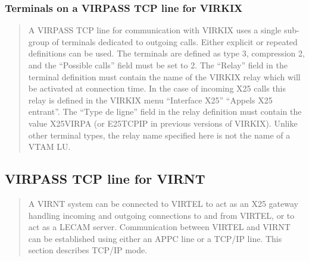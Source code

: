 \documentclass[letterpaper,10pt,english]{sphinxmanual}
\begin{document}
\subsubsection{Terminals on a VIRPASS TCP line for VIRKIX}
\label{\detokenize{connectivity_guide:terminals-on-a-virpass-tcp-line-for-virkix}}\begin{quote}

A VIRPASS TCP line for communication with VIRKIX uses a single sub-group of terminals dedicated to outgoing calls. Either explicit or repeated definitions can be used. The terminals are defined as type 3, compression 2, and the “Possible calls” field must be set to 2. The “Relay” field in the terminal definition must contain the name of the VIRKIX relay which will be activated at connection time. In the case of incoming X25 calls this relay is defined in the VIRKIX menu “Interface X25” \textendash{} “Appels X25 entrant”. The “Type de
ligne” field in the relay definition must contain the value X25VIRPA (or E25TCPIP in previous versions of VIRKIX). Unlike other terminal types, the relay name specified here is not the name of a VTAM LU.
\end{quote}



\subsection{VIRPASS TCP line for VIRNT}
\label{\detokenize{connectivity_guide:virpass-tcp-line-for-virnt}}\begin{quote}

A VIRNT system can be connected to VIRTEL to act as an X25 gateway handling incoming and outgoing connections to and from VIRTEL, or to act as a LECAM server. Communication between VIRTEL and VIRNT can be established using either an APPC line or a TCP/IP line. This section describes TCP/IP mode.
\end{quote}

\end{document}
